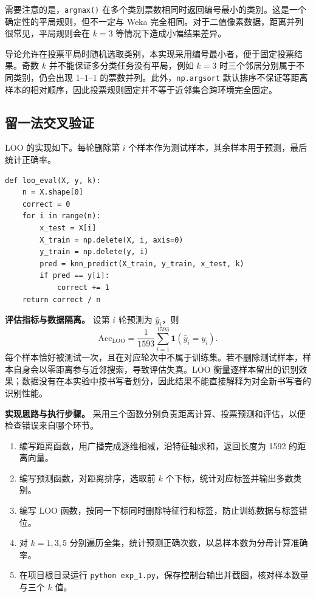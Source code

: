\documentclass[UTF8,zihao=-4]{ctexart}
\begin{document}
需要注意的是，\texttt{argmax()} 在多个类别票数相同时返回编号最小的类别。这是一个确定性的平局规则，但不一定与 Weka 完全相同。对于二值像素数据，距离并列很常见，平局规则会在 $k=3$ 等情况下造成小幅结果差异。

导论允许在投票平局时随机选取类别，本实现采用编号最小者，便于固定投票结果。奇数 $k$ 并不能保证多分类任务没有平局，例如 $k=3$ 时三个邻居分别属于不同类别，仍会出现 $1$--$1$--$1$ 的票数并列。此外，\texttt{np.argsort} 默认排序不保证等距离样本的相对顺序，因此投票规则固定并不等于近邻集合跨环境完全固定。

\subsection{留一法交叉验证}

LOO 的实现如下。每轮删除第 $i$ 个样本作为测试样本，其余样本用于预测，最后统计正确率。

\begin{lstlisting}[style=pythonstyle,caption={LOO 评估函数}]
def loo_eval(X, y, k):
    n = X.shape[0]
    correct = 0
    for i in range(n):
        x_test = X[i]
        X_train = np.delete(X, i, axis=0)
        y_train = np.delete(y, i)
        pred = knn_predict(X_train, y_train, x_test, k)
        if pred == y[i]:
            correct += 1
    return correct / n
\end{lstlisting}

\textbf{评估指标与数据隔离。} 设第 $i$ 轮预测为 $\hat y_i$，则
\[
  \mathrm{Acc}_{\mathrm{LOO}}=\frac{1}{1593}\sum_{i=1}^{1593}\mathbf{1}(\hat y_i=y_i).
\]
每个样本恰好被测试一次，且在对应轮次中不属于训练集。若不删除测试样本，样本自身会以零距离参与近邻搜索，导致评估失真。LOO 衡量逐样本留出的识别效果；数据没有在本实验中按书写者划分，因此结果不能直接解释为对全新书写者的识别性能。

\textbf{实现思路与执行步骤。} 采用三个函数分别负责距离计算、投票预测和评估，以便检查错误来自哪个环节。
\begin{enumerate}[label=\arabic*.]
  \item 编写距离函数，用广播完成逐维相减，沿特征轴求和，返回长度为 1592 的距离向量。
  \item 编写预测函数，对距离排序，选取前 $k$ 个下标，统计对应标签并输出多数类别。
  \item 编写 LOO 函数，按同一下标同时删除特征行和标签，防止训练数据与标签错位。
  \item 对 $k=1,3,5$ 分别遍历全集，统计预测正确次数，以总样本数为分母计算准确率。
  \item 在项目根目录运行 \texttt{python exp\_1.py}，保存控制台输出并截图，核对样本数量与三个 $k$ 值。
\end{enumerate}
\end{document}
